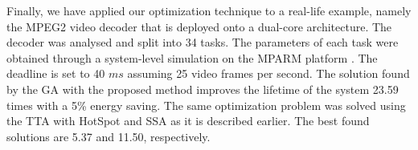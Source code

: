Finally, we have applied our optimization technique to a real-life example, namely the MPEG2 video decoder \cite{ffmpeg2011} that is deployed onto a dual-core architecture. The decoder was analysed and split into 34 tasks. The parameters of each task were obtained through a system-level simulation on the MPARM platform \cite{benini2005}. The deadline is set to 40 $ms$ assuming 25 video frames per second. The solution found by the GA with the proposed method improves the lifetime of the system 23.59 times with a 5\% energy saving. The same optimization problem was solved using the TTA with HotSpot and SSA as it is described earlier. The best found solutions are 5.37 and 11.50, respectively.
